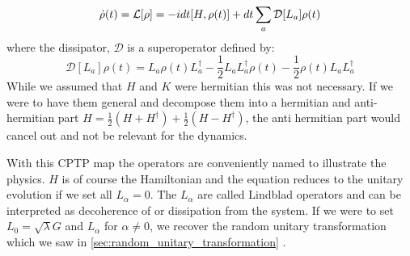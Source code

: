 \begin{equation}\label{eq:lindblad_master_equation}
    \dot{\rho}(t) = \mathcal{L}[\rho] = -i dt[H, \rho(t)] +  dt \sum_a \mathcal{D}[L_a]\rho(t)
\end{equation}
where the dissipator, $\mathcal{D}$ is a superoperator defined by:
\begin{equation}
   \mathcal{D}[L_a]\rho(t) = L_a \rho(t) L_a^\dagger - \frac12 L_a L_a^\dagger \rho(t) - \frac12 \rho(t)L_a L_a^\dagger
\end{equation}
While we assumed that $H$ and $K$ were hermitian this was not necessary. If we were to have them general and decompose them into a hermitian and anti-hermitian part $H = \frac12 (H + H^\dagger) + \frac12(H - H^\dagger)$, the anti hermitian part would cancel out and not be relevant for the dynamics. 

With this CPTP map the operators are conveniently named to illustrate the physics. $H$ is of course the Hamiltonian and the equation reduces to the unitary evolution if we set all $L_\alpha = 0$. The ${L_\alpha}$ are called Lindblad operators and can be interpreted as decoherence of or dissipation from the system. If we were to set $L_0 = \sqrt{\lambda} G$ and $L_\alpha$ for $\alpha \neq 0$, we recover the random unitary transformation which we saw in \ref{sec:random_unitary_transformation} \cite{preskill_lecture_2018}.





